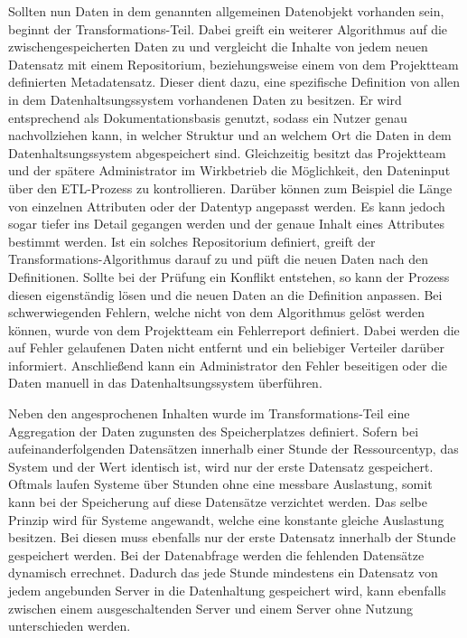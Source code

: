 Sollten nun Daten in dem genannten allgemeinen Datenobjekt vorhanden sein,
beginnt der Transformations\hyp{}Teil. Dabei greift ein weiterer Algorithmus
auf die zwischengespeicherten Daten zu und vergleicht die Inhalte von jedem
neuen Datensatz mit einem \gls{Repositorium}, beziehungsweise einem von dem
Projektteam definierten Metadatensatz. Dieser dient dazu, eine spezifische
Definition von allen in dem Datenhaltsungssystem vorhandenen Daten zu besitzen.
Er wird entsprechend als Dokumentationsbasis genutzt, sodass ein Nutzer genau
nachvollziehen kann, in welcher Struktur und an welchem Ort die Daten in dem
Datenhaltsungssystem abgespeichert sind. Gleichzeitig besitzt das Projektteam
und der spätere Administrator im Wirkbetrieb die Möglichkeit, den Dateninput
über den ETL\hyp{}Prozess zu kontrollieren. Darüber können zum Beispiel die
Länge von einzelnen Attributen oder der Datentyp angepasst werden. Es kann
jedoch sogar tiefer ins Detail gegangen werden und der genaue Inhalt eines
Attributes bestimmt werden. Ist ein solches \gls{Repositorium} definiert,
greift der Transformations\hyp{}Algorithmus darauf zu und püft die neuen Daten
nach den Definitionen. Sollte bei der Prüfung ein Konflikt entstehen, so kann
der Prozess diesen eigenständig lösen und die neuen Daten an die Definition
anpassen. Bei schwerwiegenden Fehlern, welche nicht von dem Algorithmus
gelöst werden können, wurde von dem Projektteam ein Fehlerreport definiert.
Dabei werden die auf Fehler gelaufenen Daten nicht entfernt und ein
beliebiger Verteiler darüber informiert. Anschließend kann ein Administrator
den Fehler beseitigen oder die Daten manuell in das Datenhaltsungssystem
überführen.

Neben den angesprochenen Inhalten wurde im Transformations\hyp{}Teil eine
Aggregation der Daten zugunsten des Speicherplatzes definiert. Sofern
bei aufeinanderfolgenden Datensätzen innerhalb einer Stunde der
Ressourcentyp, das System und der Wert identisch ist, wird nur der erste
Datensatz gespeichert. Oftmals laufen Systeme über Stunden ohne eine messbare
Auslastung, somit kann bei der Speicherung auf diese Datensätze verzichtet
werden. Das selbe Prinzip wird für Systeme angewandt, welche eine konstante
gleiche Auslastung besitzen. Bei diesen muss ebenfalls nur der erste Datensatz
innerhalb der Stunde gespeichert werden. Bei der Datenabfrage werden die
fehlenden Datensätze dynamisch errechnet. Dadurch das jede Stunde mindestens
ein Datensatz von jedem angebunden Server in die Datenhaltung gespeichert wird,
kann ebenfalls zwischen einem ausgeschaltenden Server und einem Server ohne
Nutzung unterschieden werden.

